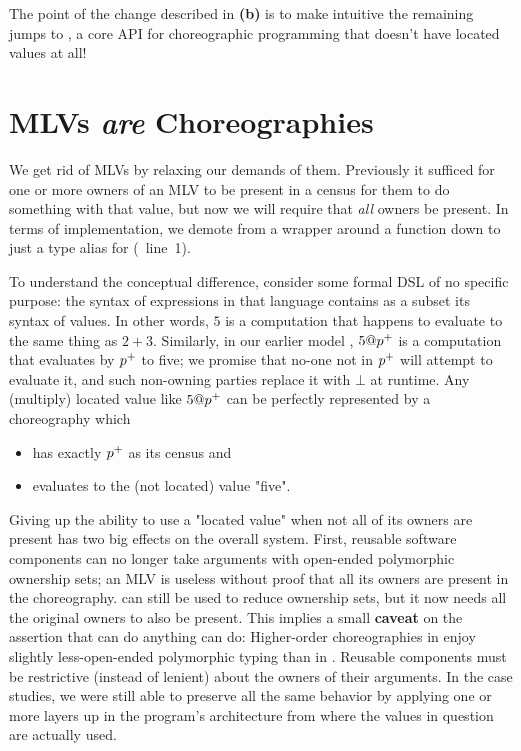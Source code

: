 The point of the change described in \textbf{(b)} is to make intuitive the remaining jumps to \minichor,
a core API for choreographic programming that
doesn't have located values at all!

\section{MLVs \emph{are} Choreographies}
\label{sec:minichor-stg3}

We get rid of MLVs by relaxing our demands of them.
Previously it sufficed for one or more owners of an MLV to be present in a census for them to do something with that value,
but now we will require that \emph{all} owners be present.
In terms of implementation,
we demote  from a  wrapper around a function down to just a type alias for 
(~line~1).

To understand the conceptual difference,
consider some formal DSL of no specific purpose:
the syntax of expressions in that language contains as a subset its syntax of values.
In other words, $5$ is a computation that happens to evaluate to the same thing as $2+3$.
Similarly, in our earlier model \HLSCentral, $5@{p^{+}}$ is a computation that evaluates by ${p^{+}}$ to five;
we promise that no-one not in ${p^{+}}$ will attempt to evaluate it, and such non-owning parties replace it with $\bot$ at runtime.
Any (multiply) located value like $5@{p^{+}}$ can be perfectly represented by a choreography which
\begin{itemize}
	\item has exactly ${p^{+}}$ as its census and
	\item evaluates to the (not located) value "five".
\end{itemize}

Giving up the ability to use a "located value" when not all of its owners are present has two big effects on the overall system.
First, reusable software components can no longer take arguments with open-ended polymorphic ownership sets;
an MLV is useless without proof that all its owners are present in the choreography.
 can still be used to reduce ownership sets, but it now needs all the original owners to also be present.
This implies a small \textbf{caveat} on the assertion that \minichor can do anything \MultiChor can do:
Higher-order choreographies in \minichor enjoy slightly less-open-ended polymorphic typing than in \MultiChor.
Reusable components must be restrictive (instead of lenient) about the owners of their arguments.
In the case studies, we were still able to preserve all the same behavior
by applying  one or more layers up in the program's architecture from where the values in question are actually used.


